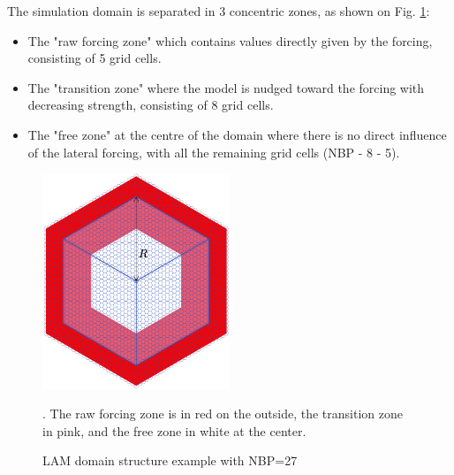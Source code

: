 \hfill

The simulation domain is separated in 3 concentric zones, as shown on Fig. \ref{fig:LAM_domain}: 
\begin{itemize}
    \item The "raw forcing zone" which contains values directly given by the forcing, consisting of 5 grid cells.
    \item The "transition zone"  where the model is nudged toward the forcing with decreasing strength, consisting of 8 grid cells.
    \item The "free zone" at the centre of the domain where there is no direct influence of the lateral forcing, with all the remaining grid cells (NBP - 8 - 5).
\end{itemize} 

\begin{figure}[ht]
    \centering
    \includegraphics[width=0.5\textwidth]{images/methods/LAM_domain_zones.png}
    \caption{LAM domain structure example with NBP=27 \citep[from][]{raillard_leveraging_2024}}. The raw forcing zone is in red on the outside, the transition zone in pink, and the free zone in white at the center.
    \label{fig:LAM_domain}
\end{figure}


